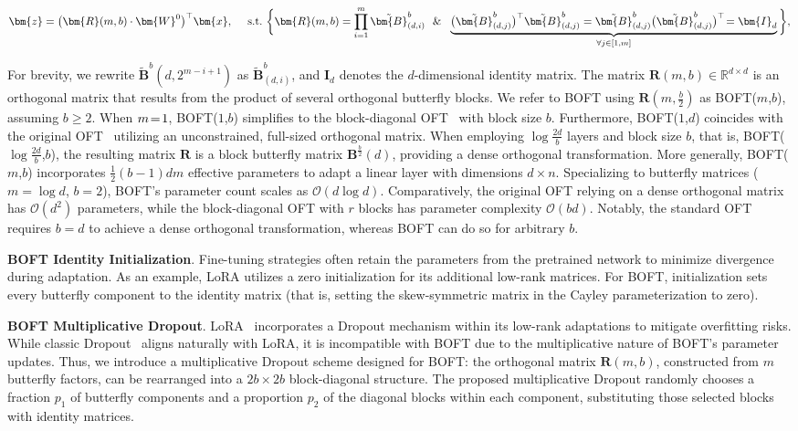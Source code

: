 \begin{equation}
    \begin{aligned}\nonumber
    \bm{z}=\big(\bm{R}(m,b)\cdot\bm{W}^0\big)^\top\bm{x},~~~~\text{s.t.}~\bigg{\{}\bm{R}(m,b)=\prod_{i=1}^m \tilde{\bm{B}}^b_{(d,i)}~~\&~~\underbrace{\big(\tilde{\bm{B}}^b_{(d,j)}\big)^\top\tilde{\bm{B}}^b_{(d,j)}=\tilde{\bm{B}}^b_{(d,j)}\big(\tilde{\bm{B}}^b_{(d,j)}\big)^\top\!=\bm{I}_d}_{\forall j\in [1, m]}\bigg{\}},
    \end{aligned}
\end{equation}

For brevity, we rewrite $\tilde{\bm{B}}^b(d,2^{m - i+1})$ as $\tilde{\bm{B}}^b_{(d,i)}$, and $\bm{I}_d$ denotes the $d$-dimensional identity matrix. The matrix $\bm{R}(m,b)\in\mathbb{R}^{d\times d}$ is an orthogonal matrix that results from the product of several orthogonal butterfly blocks. We refer to BOFT using $\bm{R}(m,\frac{b}{2})$ as BOFT($m$,$b$), assuming $b\geq 2$. When $\thickmuskip=2mu \medmuskip=2mu m=1$, BOFT($1$,$b$) simplifies to the block-diagonal OFT~\cite{qiu2023controlling} with block size $b$. Furthermore, BOFT($1$,$d$) coincides with the original OFT~\cite{qiu2023controlling} utilizing an unconstrained, full-sized orthogonal matrix. When employing $\log \frac{2d}{b}$ layers and block size $b$, that is, BOFT($\log \frac{2d}{b}$,$b$), the resulting matrix $\bm{R}$ is a block butterfly matrix $\bm{B}^{\frac{b}{2}}(d)$, providing a dense orthogonal transformation. More generally, BOFT($m$,$b$) incorporates $\frac{1}{2}(b-1)dm$ effective parameters to adapt a linear layer with dimensions $d\times n$. Specializing to butterfly matrices ($m = \log d$, $b = 2$), BOFT's parameter count scales as $\mathcal{O}(d\log d)$. Comparatively, the original OFT relying on a dense orthogonal matrix has $\mathcal{O}(d^2)$ parameters, while the block-diagonal OFT with $r$ blocks has parameter complexity $\mathcal{O}(bd)$. Notably, the standard OFT requires $b=d$ to achieve a dense orthogonal transformation, whereas BOFT can do so for arbitrary $b$.

\textbf{BOFT Identity Initialization}. Fine-tuning strategies often retain the parameters from the pretrained network to minimize divergence during adaptation. As an example, LoRA utilizes a zero initialization for its additional low-rank matrices. For BOFT, initialization sets every butterfly component to the identity matrix (that is, setting the skew-symmetric matrix in the Cayley parameterization to zero).

\textbf{BOFT Multiplicative Dropout}. LoRA~\cite{hulora2022} incorporates a Dropout mechanism within its low-rank adaptations to mitigate overfitting risks. While classic Dropout~\cite{srivastava2014dropout} aligns naturally with LoRA, it is incompatible with BOFT due to the multiplicative nature of BOFT's parameter updates. Thus, we introduce a multiplicative Dropout scheme designed for BOFT: the orthogonal matrix $\bm{R}(m,b)$, constructed from $m$ butterfly factors, can be rearranged into a $2b\times 2b$ block-diagonal structure. The proposed multiplicative Dropout randomly chooses a fraction $p_1$ of butterfly components and a proportion $p_2$ of the diagonal blocks within each component, substituting those selected blocks with identity matrices.

